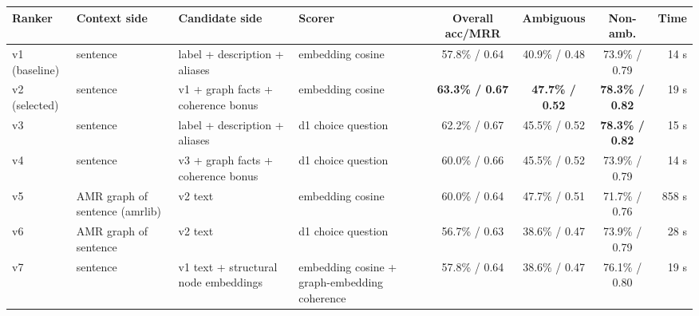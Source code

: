 \documentclass[10pt,a4paper]{article}
\begin{document}
\begin{center}\scriptsize
\renewcommand{\arraystretch}{1.0}
\begin{tabular}{@{}p{1.5cm}p{2.1cm}p{2.5cm}p{2.5cm}cccr@{}}
\toprule
Ranker & Context side & Candidate side & Scorer & Overall acc/MRR & Ambiguous & Non-amb. & Time \\
\midrule
v1 (baseline) & sentence & label + description + aliases & embedding cosine & 57.8\% / 0.64 & 40.9\% / 0.48 & 73.9\% / 0.79 & 14 s \\
v2 (selected) & sentence & v1 + graph facts + coherence bonus & embedding cosine & \textbf{63.3\% / 0.67} & \textbf{47.7\% / 0.52} & \textbf{78.3\% / 0.82} & 19 s \\
v3 & sentence & label + description + aliases & d1 choice question & 62.2\% / 0.67 & 45.5\% / 0.52 & \textbf{78.3\% / 0.82} & 15 s \\
v4 & sentence & v3 + graph facts + coherence bonus & d1 choice question & 60.0\% / 0.66 & 45.5\% / 0.52 & 73.9\% / 0.79 & 14 s \\
v5 & AMR graph of sentence (amrlib) & v2 text & embedding cosine & 60.0\% / 0.64 & 47.7\% / 0.51 & 71.7\% / 0.76 & 858 s \\
v6 & AMR graph of sentence & v2 text & d1 choice question & 56.7\% / 0.63 & 38.6\% / 0.47 & 73.9\% / 0.79 & 28 s \\
v7 & sentence & v1 text + structural node embeddings & embedding cosine + graph-embedding coherence & 57.8\% / 0.64 & 38.6\% / 0.47 & 76.1\% / 0.80 & 19 s \\
\bottomrule
\end{tabular}
\end{center}
\end{document}
